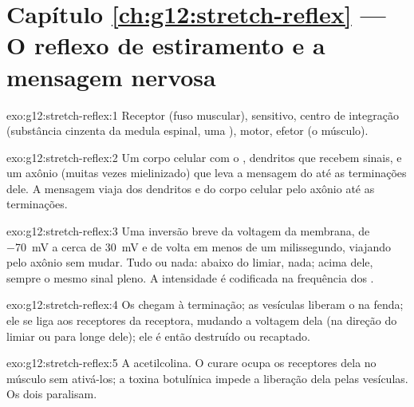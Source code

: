 \section*{Capítulo \ref{ch:g12:stretch-reflex} --- O reflexo de estiramento e a mensagem nervosa}

\begin{solution}{exo:g12:stretch-reflex:1}
Receptor (fuso muscular),  sensitivo, centro de integração
(substância cinzenta da medula espinal, uma ),  motor,
efetor (o músculo).
\end{solution}

\begin{solution}{exo:g12:stretch-reflex:2}
Um corpo celular com o , dendritos que recebem sinais, e um
axônio (muitas vezes mielinizado) que leva a mensagem do  até
as terminações dele. A mensagem viaja dos dendritos e do corpo celular
pelo axônio até as terminações.
\end{solution}

\begin{solution}{exo:g12:stretch-reflex:3}
Uma inversão breve da voltagem da membrana, de \qty{-70}{mV} a cerca de
\qty{+30}{mV} e de volta em menos de um milissegundo, viajando pelo
axônio sem mudar. Tudo ou nada: abaixo do limiar, nada; acima dele,
sempre o mesmo sinal pleno. A intensidade é codificada na frequência
dos .
\end{solution}

\begin{solution}{exo:g12:stretch-reflex:4}
Os  chegam à terminação; as vesículas liberam o
 na fenda; ele se liga aos receptores da 
receptora, mudando a voltagem dela (na direção do limiar ou para longe
dele); ele é então destruído ou recaptado.
\end{solution}

\begin{solution}{exo:g12:stretch-reflex:5}
A acetilcolina. O curare ocupa os receptores dela no músculo sem
ativá-los; a toxina botulínica impede a liberação dela pelas vesículas.
Os dois paralisam.
\end{solution}

